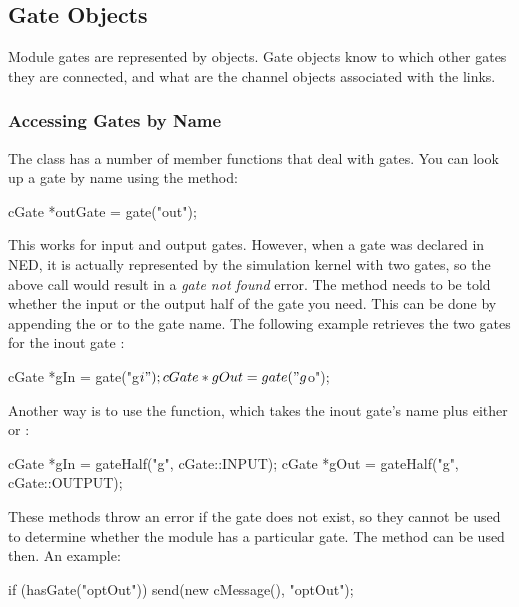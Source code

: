 \subsection{Gate Objects}

Module gates are represented by  objects.
Gate objects know to which other gates they are connected, and
what are the channel objects associated with the links.

\subsubsection{Accessing Gates by Name}

The  class has a number of member functions that
deal with gates. You can look up a gate by name using the 
method:

\begin{cpp}
cGate *outGate = gate("out");
\end{cpp}

This works for input and output gates. However, when a gate was declared
 in NED, it is actually represented by the simulation kernel
with two gates, so the above call would result in a \textit{gate not found}
error. The  method needs to be told whether the input or
the output half of the gate you need. This can be done by appending
the  or  to the gate name. The following example
retrieves the two gates for the inout gate :

\begin{cpp}
cGate *gIn = gate("g$i");
cGate *gOut = gate("g$o");
\end{cpp}

Another way is to use the  function, which takes
the inout gate's name plus either  or :

\begin{cpp}
cGate *gIn = gateHalf("g", cGate::INPUT);
cGate *gOut = gateHalf("g", cGate::OUTPUT);
\end{cpp}

These methods throw an error if the gate does not exist, so they cannot
be used to determine whether the module has a particular gate.
The  method can be used then. An example:

\begin{cpp}
if (hasGate("optOut"))
   send(new cMessage(), "optOut");
\end{cpp}

